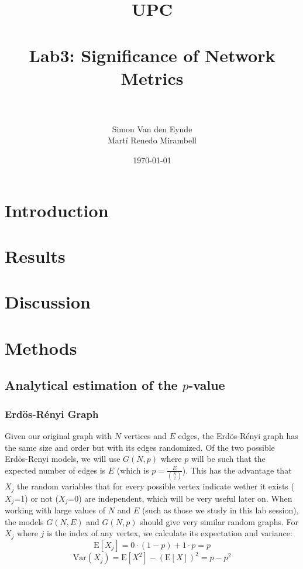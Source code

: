 \documentclass[paper=a4, fontsize=11pt]{scrartcl} %
\title{	
\normalfont \normalsize 
\textsc{UPC} \\ [25pt] %
\horrule{0.5pt} \\[0.4cm] %
\huge Lab3: Significance of Network Metrics \\ %
\horrule{2pt} \\[0.5cm] %
}
\author{Simon Van den Eynde\\ Martí Renedo Mirambell} %
\date{\normalsize\today} %
\newcommand{\E}{\mathrm{E}}
\newcommand{\Var}{\mathrm{Var}}
\begin{document}
\maketitle %



\section{Introduction}


\section{Results}

\section{Discussion}

\section{Methods}

\subsection{Analytical estimation of the $p$-value}
\subsubsection{Erdös-Rényi Graph}
Given our original graph with $N$ vertices and $E$ edges, the Erdös-Rényi graph has the same size and order but with its edges randomized.  Of the two possible Erdös-Renyi models, we will use $G(N,p)$ where $p$ will be such that the expected number of edges is $E$ (which is $p=\frac{E}{\binom{N}{2}}$). This has the advantage that $X_j$ the random variables that for every possible vertex indicate wether it exists ($X_j$=1) or not ($X_j$=0) are independent, which will be very useful later on. When working with large values of $N$ and $E$ (such as those we study in this lab session), the models $G(N,E)$ and $G(N,p)$ should give very similar random graphs. 
For $X_j$ where $j$ is the index of any vertex, we calculate its expectation and variance: 
$$\E[X_j]=0\cdot(1-p)+1\cdot p=p$$
$$\Var(X_j)=\E[X^2]-(\E[X])^2=p-p^2$$
\end{document}
